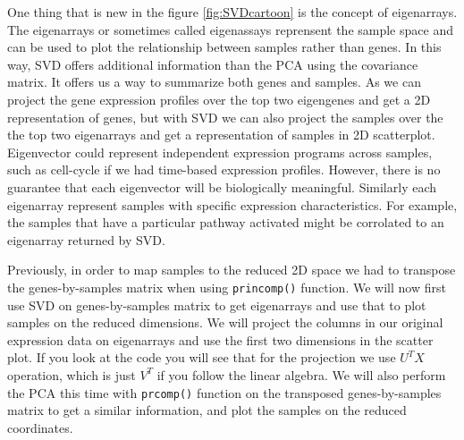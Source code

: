 \documentclass[12pt,]{krantz}
\theoremstyle{definition}
\theoremstyle{definition}
\theoremstyle{definition}
\theoremstyle{remark}
\begin{document}
One thing that is new in the figure \ref{fig:SVDcartoon} is the concept
of eigenarrays. The eigenarrays or sometimes called eigenassays
reprensent the sample space and can be used to plot the relationship
between samples rather than genes. In this way, SVD offers additional
information than the PCA using the covariance matrix. It offers us a way
to summarize both genes and samples. As we can project the gene
expression profiles over the top two eigengenes and get a 2D
representation of genes, but with SVD we can also project the samples
over the the top two eigenarrays and get a representation of samples in
2D scatterplot. Eigenvector could represent independent expression
programs across samples, such as cell-cycle if we had time-based
expression profiles. However, there is no guarantee that each
eigenvector will be biologically meaningful. Similarly each eigenarray
represent samples with specific expression characteristics. For example,
the samples that have a particular pathway activated might be corrolated
to an eigenarray returned by SVD.

Previously, in order to map samples to the reduced 2D space we had to
transpose the genes-by-samples matrix when using \texttt{princomp()}
function. We will now first use SVD on genes-by-samples matrix to get
eigenarrays and use that to plot samples on the reduced dimensions. We
will project the columns in our original expression data on eigenarrays
and use the first two dimensions in the scatter plot. If you look at the
code you will see that for the projection we use \(U^T X\) operation,
which is just \(V^T\) if you follow the linear algebra. We will also
perform the PCA this time with \texttt{prcomp()} function on the
transposed genes-by-samples matrix to get a similar information, and
plot the samples on the reduced coordinates.
\end{document}
